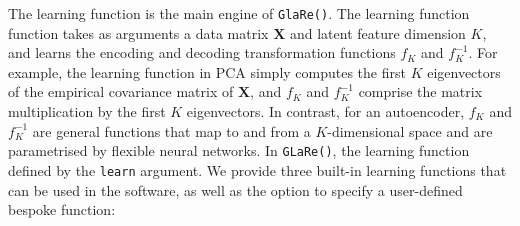 The learning function is the main engine of \texttt{GlaRe()}.
The learning function function takes as arguments a data matrix $\mathbf{X}$ and latent feature dimension $K$, and learns the encoding and decoding transformation functions $f_K$ and $f_K^{-1}$.
For example, the learning function in PCA simply computes the first $K$ eigenvectors of the empirical covariance matrix of $\mathbf{X}$, and $f_K$ and $f_K^{-1}$ comprise the matrix multiplication by the first $K$ eigenvectors.
In contrast, for an autoencoder, $f_K$ and $f_K^{-1}$ are general functions that map to and from a $K$-dimensional space and are parametrised by flexible neural networks.
In \texttt{GLaRe()}, the learning function defined by the \texttt{learn} argument. We provide three built-in learning functions that can be used in the software, as well as the option to specify a user-defined bespoke function:

